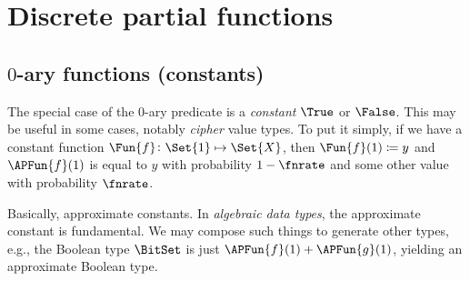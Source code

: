 \documentclass[ ../main.tex]{subfiles}
\begin{document}
\section{Discrete partial functions}

\subsection{$0$-ary functions (constants)}
The special case of the $0$-ary predicate is a \emph{constant} $\True$ or $\False$.
This may be useful in some cases, notably \emph{cipher} value types.
To put it simply, if we have a constant function $\Fun{f} \colon \Set{1} \mapsto \Set{X}$, then $\Fun{f}(1) \coloneqq y$ and $\APFun{f}(1)$ is equal to $y$ with probability $1-\fnrate$ and some other value with probability $\fnrate$.

Basically, approximate constants.
In \emph{algebraic data types}, the approximate constant is fundamental.
We may compose such things to generate other types, e.g., the Boolean type $\BitSet$ is just $\APFun{f}(1) + \APFun{g}(1)$, yielding an approximate Boolean type.
\end{document}
